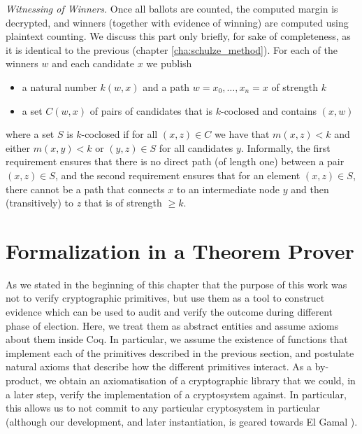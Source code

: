 \smallskip\noindent\emph{Witnessing of Winners.}
Once all ballots are counted, the computed margin is decrypted, and
winners (together with evidence of winning) are computed using 
plaintext counting. We discuss this part only briefly, for sake of completeness,
 as it is identical to the previous (chapter \ref{cha:schulze_method}).
 For each of the winners $w$ and each
candidate $x$ we publish
\begin{itemize}
\item a natural number $k(w, x)$ and a path $w = x_0, \dots, x_n = x$ of strength $k$
\item a set $C(w, x)$ of pairs of candidates that is $k$-coclosed
and contains $(x, w)$
\end{itemize}
where a set $S$ is  $k$-coclosed if for all $(x,z) \in C$ we have
that $m(x, z) < k$ and either $m(x, y) < k$ or $(y,z) \in S$ for
all candidates $y$.  Informally, the first requirement ensures that
there is no direct path (of length one) between a pair $(x, z) \in
S$, and the second requirement ensures that for an element $(x, z)
\in S$, there cannot be a path that connects $x$ to an intermediate
node $y$ and then (transitively) to $z$ that is of strength $\geq
k$.


\section{Formalization in a Theorem Prover} \label{sec:realisation}


As we stated in the beginning of this chapter that the purpose of this work was 
not to verify cryptographic primitives, 
but use them as a tool to construct evidence which can be used 
to audit and verify the outcome during different phase 
of election. Here, we treat them as abstract entities and assume
axioms about them inside Coq.
In particular, we assume the existence of functions that implement
each of the primitives described in the previous section, and
postulate natural axioms that describe how the different primitives
interact. As a by-product, we obtain an axiomatisation of a
cryptographic library that we could, in a later step, verify the
implementation of a cryptosystem against.  In particular, this
allows us to not commit to any particular cryptosystem in particular
(although our development, and later instantiation, is geared
towards El Gamal \citep{DBLP:conf/crypto/Gamal84}).

